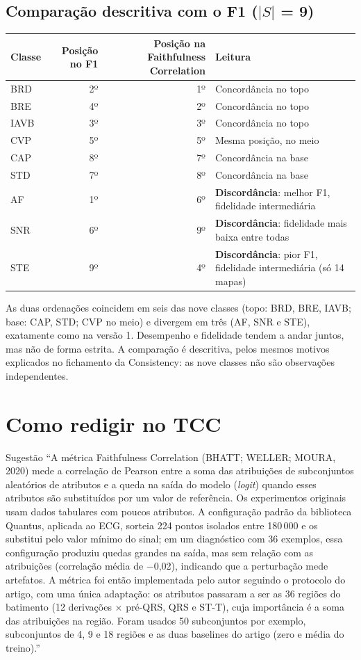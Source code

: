 \documentclass[11pt,a4paper]{article}
\begin{document}
\subsection{Comparação descritiva com o F1 ($|S|$ = 9)}
\begin{center}\small
\begin{tabularx}{\linewidth}{lrrX}
\toprule
\textbf{Classe} & \textbf{Posição no F1} & \textbf{Posição na Faithfulness Correlation} & \textbf{Leitura} \\
\midrule
BRD  & 2º & 1º & Concordância no topo \\
BRE  & 4º & 2º & Concordância no topo \\
IAVB & 3º & 3º & Concordância no topo \\
CVP  & 5º & 5º & Mesma posição, no meio \\
CAP  & 8º & 7º & Concordância na base \\
STD  & 7º & 8º & Concordância na base \\
AF   & 1º & 6º & \textbf{Discordância}: melhor F1, fidelidade intermediária \\
SNR  & 6º & 9º & \textbf{Discordância}: fidelidade mais baixa entre todas \\
STE  & 9º & 4º & \textbf{Discordância}: pior F1, fidelidade intermediária (só 14 mapas) \\
\bottomrule
\end{tabularx}
\end{center}
As duas ordenações coincidem em seis das nove classes (topo: BRD, BRE, IAVB; base: CAP, STD; CVP no meio) e divergem em três (AF, SNR e STE), exatamente como na versão 1. Desempenho e fidelidade tendem a andar juntos, mas não de forma estrita. A comparação é descritiva, pelos mesmos motivos explicados no fichamento da Consistency: as nove classes não são observações independentes.

\section{Como redigir no TCC}
\begin{infobox}[ok]{Sugestão}
“A métrica Faithfulness Correlation (BHATT; WELLER; MOURA, 2020) mede a correlação de Pearson entre a soma das atribuições de subconjuntos aleatórios de atributos e a queda na saída do modelo (\textit{logit}) quando esses atributos são substituídos por um valor de referência. Os experimentos originais usam dados tabulares com poucos atributos. A configuração padrão da biblioteca Quantus, aplicada ao ECG, sorteia 224 pontos isolados entre 180\,000 e os substitui pelo valor mínimo do sinal; em um diagnóstico com 36 exemplos, essa configuração produziu quedas grandes na saída, mas sem relação com as atribuições (correlação média de $-$0,02), indicando que a perturbação mede artefatos. A métrica foi então implementada pelo autor seguindo o protocolo do artigo, com uma única adaptação: os atributos passaram a ser as 36 regiões do batimento (12 derivações × pré-QRS, QRS e ST-T), cuja importância é a soma das atribuições na região. Foram usados 50 subconjuntos por exemplo, subconjuntos de 4, 9 e 18 regiões e as duas baselines do artigo (zero e média do treino).”
\end{infobox}
\end{document}
